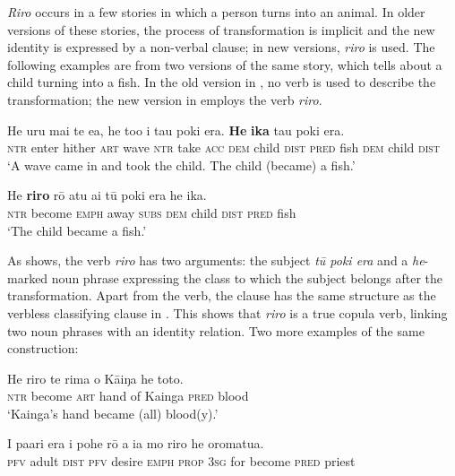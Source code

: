 \textit{Riro} occurs in a few stories in which a person turns into an animal. In older versions of these stories, the process of transformation is implicit and the new identity is expressed by a non-verbal clause; in new versions, \textit{riro} is used. The following examples are from two versions of the same story, which tells about a child turning into a fish. In the old version in , no verb is used to describe the transformation; the new version in  employs the verb \textit{riro}.

\ea\label{ex:9.106}
\gll He uru mai te e{\ꞌ}a, he to{\ꞌ}o i tau poki era. \textbf{He} \textbf{ika} tau poki era. \\
\textsc{ntr} enter hither \textsc{art} wave \textsc{ntr} take \textsc{acc} \textsc{dem} child \textsc{dist} \textsc{pred} fish \textsc{dem} child \textsc{dist} \\

\glt 
‘A wave came in and took the child. The child (became) a fish.’ \textstyleExampleref{[Mtx-7-10.019]}
\z

\ea\label{ex:9.107}
\gll He \textbf{riro} rō atu {\ꞌ}ai tū poki era he ika. \\
\textsc{ntr} become \textsc{emph} away \textsc{subs} \textsc{dem} child \textsc{dist} \textsc{pred} fish \\

\glt
‘The child became a fish.’ \textstyleExampleref{[R338.006]} 
\z

As  shows, the verb \textit{riro} has two arguments: the subject \textit{tū poki era} and a \textit{he}-marked noun phrase expressing the class to which the subject belongs after the transformation. Apart from the verb, the clause has the same structure as the verbless classifying clause in . This shows that \textit{riro} is a true copula verb, linking two noun phrases with an identity relation. Two more examples of the same construction:

\ea\label{ex:9.108}
\gll He riro te rima o Kāiŋa he toto. \\
\textsc{ntr} become \textsc{art} hand of Kainga \textsc{pred} blood \\

\glt 
‘Kainga’s hand became (all) blood(y).’ \textstyleExampleref{[R243.074]} 
\z

\ea\label{ex:9.109}
\gll I pa{\ꞌ}ari era i pohe rō a ia mo riro he oromatu{\ꞌ}a. \\
\textsc{pfv} adult \textsc{dist} \textsc{pfv} desire \textsc{emph} \textsc{prop} \textsc{3sg} for become \textsc{pred} priest \\

